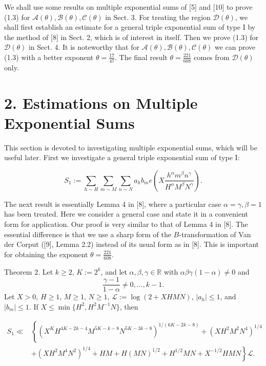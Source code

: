 \documentclass[10pt]{article}
\begin{document}
We shall use some results on multiple exponential sums of [5] and [10] to prove (1.3) for $\mathscr{A}(\theta), \mathscr{B}(\theta), \mathscr{C}(\theta)$ in Sect. 3. For treating the region $\mathscr{D}(\theta)$, we shall first establish an estimate for a general triple exponential sum of type I by the method of [8] in Sect. 2, which is of interest in itself. Then we prove (1.3) for $\mathscr{D}(\theta)$ in Sect. 4. It is noteworthy that for $\mathscr{A}(\theta), \mathscr{B}(\theta), \mathscr{C}(\theta)$ we can prove (1.3) with a better exponent $\theta=\frac{17}{47}$. The final result $\theta=\frac{221}{608}$ comes from $\mathscr{D}(\theta)$ only.

\section*{2. Estimations on Multiple Exponential Sums}
This section is devoted to investigating multiple exponential sums, which will be useful later. First we investigate a general triple exponential sum of type I:

$$
S_{1}:=\sum_{h \sim H} \sum_{m \sim M} \sum_{n \sim N} a_{h} b_{m} e\left(X \frac{h^{\alpha} m^{\beta} n^{\gamma}}{H^{\alpha} M^{\beta} N^{\gamma}}\right) .
$$

The next result is essentially Lemma 4 in [8], where a particular case $\alpha=\gamma, \beta=1$ has been treated. Here we consider a general case and state it in a convenient form for application. Our proof is very similar to that of Lemma 4 in [8]. The essential difference is that we use a sharp form of the $B$-transformation of Van der Corput ([9], Lemma 2.2) instead of its usual form as in [8]. This is important for obtaining the exponent $\theta=\frac{221}{608}$.

Theorem 2. Let $k \geqslant 2$, $K:=2^{k}$, and let $\alpha, \beta, \gamma \in \mathbb{R}$ with $\alpha\beta\gamma(1-\alpha) \neq 0$ and
\[
\frac{\gamma-1}{1-\alpha} \neq 0,\ldots,k-1.
\]
Let $X>0$, $H \geqslant 1$, $M \geqslant 1$, $N \geqslant 1$, $\mathscr{L}:=\log(2+XHMN)$, $|a_h|\leqslant 1$, and $|b_m|\leqslant 1$. If $X \leqslant \min\{H^{2},H^{2}M^{-1}N\}$, then

$$
\begin{aligned}
S_{1} \ll & \left\{\left(X^{K} H^{4 K-2 k-4} M^{5 K-k-8} N^{5 K-3 k-8}\right)^{1 /(6 K-2 k-8)}+\left(X H^{2} M^{2} N^{4}\right)^{1 / 4}\right. \\
& \left.+\left(X H^{2} M^{4} N^{2}\right)^{1 / 4}+H M+H(M N)^{1 / 2}+H^{1 / 2} M N+X^{-1 / 2} H M N\right\} \mathscr{L} .
\end{aligned}
$$
\end{document}
